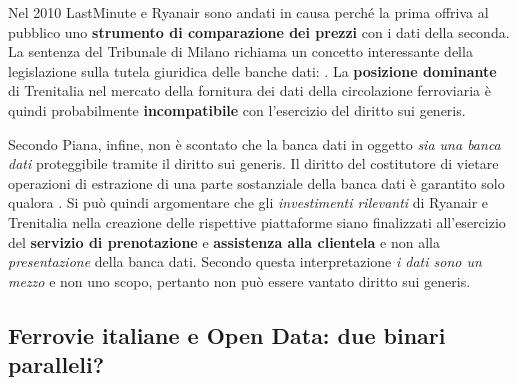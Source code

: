 \documentclass[12pt,italian]{report}
\begin{document}
Nel 2010 LastMinute e Ryanair sono andati in causa perché la prima
offriva al pubblico uno \textbf{strumento di comparazione dei prezzi}
con i dati della seconda.  La sentenza \cite{RyanairSentenza} del
Tribunale di Milano richiama un concetto interessante della
legislazione sulla tutela giuridica delle banche dati:
.  La
\textbf{posizione dominante} di Trenitalia nel mercato della fornitura
dei dati della circolazione ferroviaria è quindi probabilmente
\textbf{incompatibile} con l'esercizio del diritto sui generis.

Secondo Piana, infine, non è scontato che la banca dati in oggetto
\textit{sia una banca dati} proteggibile tramite il diritto sui
generis.  Il diritto del costitutore di vietare operazioni di
estrazione di una parte sostanziale della banca dati è garantito solo
qualora .  Si può quindi argomentare che gli
\textit{investimenti rilevanti} di Ryanair e Trenitalia nella
creazione delle rispettive piattaforme siano finalizzati all'esercizio
del \textbf{servizio di prenotazione} e \textbf{assistenza alla
    clientela} e non alla \textit{presentazione} della banca dati.
Secondo questa interpretazione \textit{i dati sono un mezzo} e non uno
scopo, pertanto non può essere vantato diritto sui generis.

\subsection{Ferrovie italiane e Open Data: due binari paralleli?}
\end{document}
